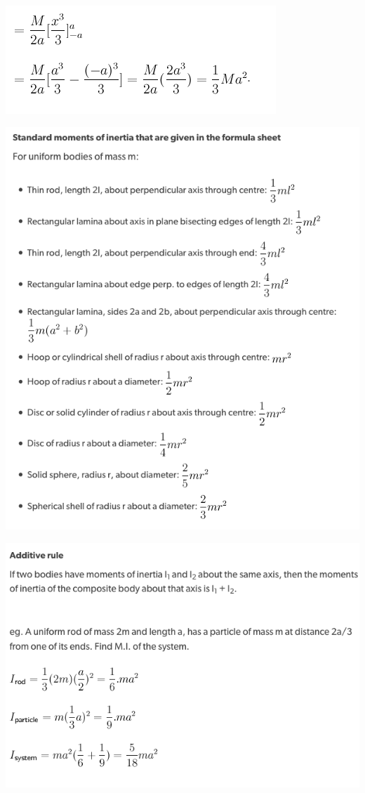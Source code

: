 \documentclass[a4paper]{article}
\begin{document}
\begin{center}
    \includegraphics[scale=0.5]{img_M/23_eg3}
\end{center}
\begin{center}
    \includegraphics[scale=0.5]{img_M/23_eg4}
\end{center}
\begin{center}
    \includegraphics[scale=0.5]{img_M/23_eg5}
\end{center}
\end{document}
